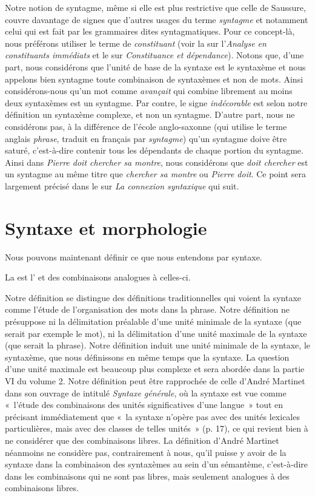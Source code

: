 {    Notre notion de syntagme, même si elle est plus restrictive que celle de Saussure, couvre davantage de signes que d’autres usages du terme \textit{syntagme} et notamment celui qui est fait par les grammaires dites syntagmatiques. Pour ce concept-là, nous préférons utiliser le terme de \textit{constituant} (voir la  sur l'\textit{{Analyse en constituants immédiats}} et le  sur \textit{{Constituance et dépendance}}). Notons que, d’une part, nous considérons que l’unité de base de la syntaxe est le syntaxème et nous appelons bien syntagme toute combinaison de syntaxèmes et non de mots. Ainsi considérons-nous qu’un mot comme \textit{avançait} qui combine librement au moins deux syntaxèmes est un syntagme. Par contre, le signe \textit{indécorable} est selon notre définition un syntaxème complexe, et non un syntagme. D’autre part, nous ne considérons pas, à la différence de l’école anglo-saxonne (qui utilise le terme anglais \textit{phrase}, traduit en français par \textit{syntagme}) qu’un syntagme doive être saturé, c’est-à-dire contenir tous les dépendants de chaque portion du syntagme. Ainsi dans \textit{Pierre doit chercher sa montre}, nous considérons que \textit{doit chercher} est un syntagme au même titre que \textit{chercher sa montre} ou \textit{Pierre doit}. Ce point sera largement précisé dans le  sur \textit{La connexion syntaxique} qui suit.
}
\section{Syntaxe et morphologie}\label{sec:3.1.6}

Nous pouvons maintenant définir ce que nous entendons par syntaxe.

{La  est l'  et des combinaisons analogues à celles-ci.}

Notre définition se distingue des définitions traditionnelles qui voient la syntaxe comme l’étude de l’organisation des mots dans la phrase. Notre définition ne présuppose ni la délimitation préalable d’une unité minimale de la syntaxe (que serait par exemple le mot), ni la délimitation d’une unité maximale de la syntaxe (que serait la phrase). Notre définition induit une unité minimale de la syntaxe, le syntaxème, que nous définissons en même temps que la syntaxe. La question d’une unité maximale est beaucoup plus complexe et sera abordée dans la partie VI du volume 2. Notre définition peut être rapprochée de celle d’André Martinet dans son ouvrage de \citeyear{martinet1985syntaxe} intitulé \textit{Syntaxe générale}, où la syntaxe est vue comme «~l’étude des combinaisons des unités significatives d’une langue~» tout en précisant immédiatement que «~la syntaxe n’opère pas avec des unités lexicales particulières, mais avec des classes de telles unités~» (p. 17), ce qui revient bien à ne considérer que des combinaisons libres. La définition d’André Martinet néanmoins ne considère pas, contrairement à nous, qu’il puisse y avoir de la syntaxe dans la combinaison des syntaxèmes au sein d’un sémantème, c’est-à-dire dans les combinaisons qui ne sont pas libres, mais seulement analogues à des combinaisons libres.

